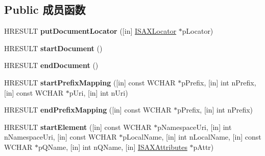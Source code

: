 \subsection*{Public 成员函数}
\begin{DoxyCompactItemize}
\item 
\mbox{\label{interface_m_s_x_m_l2_1_1_i_s_a_x_content_handler_a0d24811b770d414786d4055913923d3d}} 
H\+R\+E\+S\+U\+LT {\bfseries put\+Document\+Locator} (\mbox{[}in\mbox{]} \hyperlink{interface_m_s_x_m_l2_1_1_i_s_a_x_locator}{I\+S\+A\+X\+Locator} $\ast$p\+Locator)
\item 
\mbox{\label{interface_m_s_x_m_l2_1_1_i_s_a_x_content_handler_a97b4a41e9d18c71dcb60e09fc2582e5d}} 
H\+R\+E\+S\+U\+LT {\bfseries start\+Document} ()
\item 
\mbox{\label{interface_m_s_x_m_l2_1_1_i_s_a_x_content_handler_a16cbfe414cee7b6d4e5da68de807078e}} 
H\+R\+E\+S\+U\+LT {\bfseries end\+Document} ()
\item 
\mbox{\label{interface_m_s_x_m_l2_1_1_i_s_a_x_content_handler_af135118b53eb5864490608b08ca4798e}} 
H\+R\+E\+S\+U\+LT {\bfseries start\+Prefix\+Mapping} (\mbox{[}in\mbox{]} const W\+C\+H\+AR $\ast$p\+Prefix, \mbox{[}in\mbox{]} int n\+Prefix, \mbox{[}in\mbox{]} const W\+C\+H\+AR $\ast$p\+Uri, \mbox{[}in\mbox{]} int n\+Uri)
\item 
\mbox{\label{interface_m_s_x_m_l2_1_1_i_s_a_x_content_handler_a06c723c48ab35b9ce3ad0b7c38b53bd6}} 
H\+R\+E\+S\+U\+LT {\bfseries end\+Prefix\+Mapping} (\mbox{[}in\mbox{]} const W\+C\+H\+AR $\ast$p\+Prefix, \mbox{[}in\mbox{]} int n\+Prefix)
\item 
\mbox{\label{interface_m_s_x_m_l2_1_1_i_s_a_x_content_handler_a11c994d3615fa625da53f6e561e32a46}} 
H\+R\+E\+S\+U\+LT {\bfseries start\+Element} (\mbox{[}in\mbox{]} const W\+C\+H\+AR $\ast$p\+Namespace\+Uri, \mbox{[}in\mbox{]} int n\+Namespace\+Uri, \mbox{[}in\mbox{]} const W\+C\+H\+AR $\ast$p\+Local\+Name, \mbox{[}in\mbox{]} int n\+Local\+Name, \mbox{[}in\mbox{]} const W\+C\+H\+AR $\ast$p\+Q\+Name, \mbox{[}in\mbox{]} int n\+Q\+Name, \mbox{[}in\mbox{]} \hyperlink{interface_m_s_x_m_l2_1_1_i_s_a_x_attributes}{I\+S\+A\+X\+Attributes} $\ast$p\+Attr)

\end{DoxyCompactItemize}
